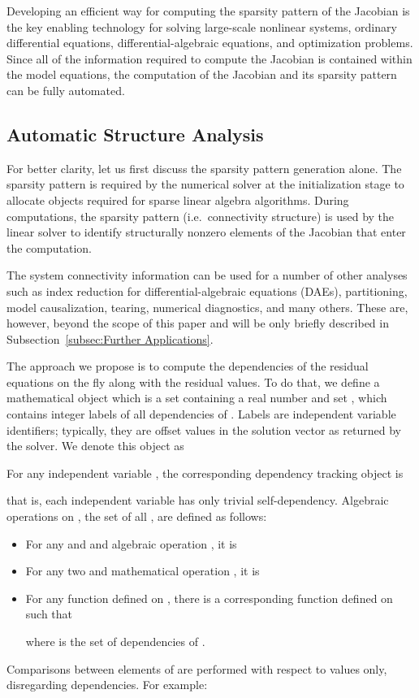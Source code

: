 \documentclass[10pt]{ijnam}
\theoremstyle{definition}
\begin{document}
Developing an efficient way for computing the sparsity pattern of the Jacobian is the key enabling technology for solving large-scale nonlinear systems, ordinary differential equations, differential-algebraic equations, and optimization problems. Since all of the information required to compute the Jacobian is contained within the model equations, the computation of the Jacobian and its sparsity pattern can be fully automated.

\subsection{Automatic Structure Analysis}

For better clarity, let us first discuss the sparsity pattern generation alone. The sparsity pattern is required by the numerical solver at the initialization stage to allocate objects required for sparse linear algebra algorithms. During computations, the sparsity pattern (i.e.\ connectivity structure) is used by the linear solver to identify structurally nonzero elements of the Jacobian that enter the computation.

The system connectivity information can be used for a number of other analyses such as index reduction for differential-algebraic equations (DAEs), partitioning, model causalization, tearing, numerical diagnostics, and many others. These are, however, beyond the scope of this paper and will be only briefly described in Subsection~\ref{subsec:Further Applications}.

The approach we propose is to compute the dependencies of the residual equations on the fly along with the
residual values. To do that, we
define a mathematical object  which is a set containing a real number 
 and set , which contains integer labels of all dependencies of . 
Labels are independent variable identifiers; typically, they are offset values in the 
solution vector as returned by the solver. We denote this object as

For any independent variable , the corresponding dependency tracking object is

that is, each independent variable has only trivial self-dependency. Algebraic 
operations on , the set of all , are defined as follows:
\begin{itemize}[leftmargin=1em]
\item For any  and  and algebraic operation 
, it is
 
\item For any two  and mathematical operation 
, it is

\item For any function  defined on , there is a corresponding function 
 defined on  such that

where  is the set of dependencies of .
\end{itemize}
Comparisons between elements of  are performed with respect to values 
only, disregarding dependencies. For example:
\end{document}
